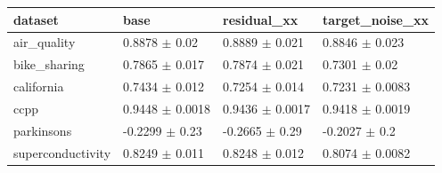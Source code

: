 \begin{tabular}{llll}
\toprule
dataset & base & residual\_xx & target\_noise\_xx \\
\midrule
air\_quality & 0.8878 $\pm$ 0.02 & 0.8889 $\pm$ 0.021 & 0.8846 $\pm$ 0.023 \\
bike\_sharing & 0.7865 $\pm$ 0.017 & 0.7874 $\pm$ 0.021 & 0.7301 $\pm$ 0.02 \\
california & 0.7434 $\pm$ 0.012 & 0.7254 $\pm$ 0.014 & 0.7231 $\pm$ 0.0083 \\
ccpp & 0.9448 $\pm$ 0.0018 & 0.9436 $\pm$ 0.0017 & 0.9418 $\pm$ 0.0019 \\
parkinsons & -0.2299 $\pm$ 0.23 & -0.2665 $\pm$ 0.29 & -0.2027 $\pm$ 0.2 \\
superconductivity & 0.8249 $\pm$ 0.011 & 0.8248 $\pm$ 0.012 & 0.8074 $\pm$ 0.0082 \\
\bottomrule
\end{tabular}
